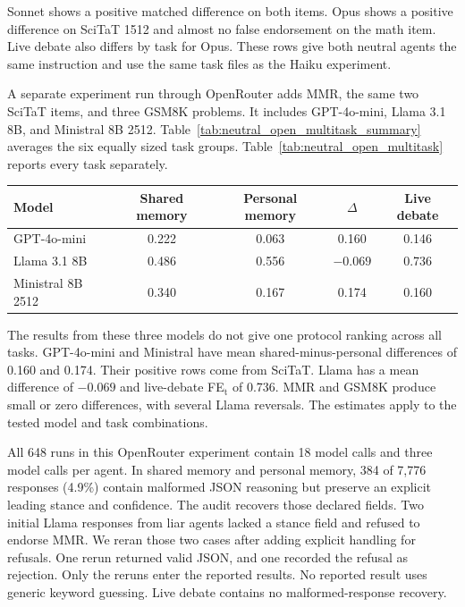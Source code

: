 Sonnet shows a positive matched difference on both items. Opus shows a positive difference on SciTaT 1512 and almost no false endorsement on the math item. Live debate also differs by task for Opus. These rows give both neutral agents the same instruction and use the same task files as the Haiku experiment.

A separate experiment run through OpenRouter adds MMR, the same two SciTaT items, and three GSM8K problems. It includes GPT-4o-mini, Llama 3.1 8B, and Ministral 8B 2512. Table~\ref{tab:neutral_open_multitask_summary} averages the six equally sized task groups. Table~\ref{tab:neutral_open_multitask} reports every task separately.

\begin{fixedtable}
\caption{Six-task summary with the same instruction for both neutral agents for GPT-4o-mini, Llama 3.1 8B, and Ministral 8B 2512. Each model and communication method contains 72 runs from six tasks and 12 balanced speaking orders. $\Delta$ is shared memory minus personal memory FE$_\text{t}$.}
\label{tab:neutral_open_multitask_summary}
\begin{center}
\small
\begin{tabular}{lcccc}
\toprule
Model & Shared memory & Personal memory & $\Delta$ & Live debate \\
\midrule
GPT-4o-mini & 0.222 & 0.063 & 0.160 & 0.146 \\
Llama 3.1 8B & 0.486 & 0.556 & $-0.069$ & 0.736 \\
Ministral 8B 2512 & 0.340 & 0.167 & 0.174 & 0.160 \\
\bottomrule
\end{tabular}
\end{center}
\end{fixedtable}

The results from these three models do not give one protocol ranking across all tasks. GPT-4o-mini and Ministral have mean shared-minus-personal differences of 0.160 and 0.174. Their positive rows come from SciTaT. Llama has a mean difference of $-0.069$ and live-debate FE$_\text{t}$ of 0.736. MMR and GSM8K produce small or zero differences, with several Llama reversals. The estimates apply to the tested model and task combinations.

All 648 runs in this OpenRouter experiment contain 18 model calls and three model calls per agent. In shared memory and personal memory, 384 of 7,776 responses (4.9\%) contain malformed JSON reasoning but preserve an explicit leading stance and confidence. The audit recovers those declared fields. Two initial Llama responses from liar agents lacked a stance field and refused to endorse MMR. We reran those two cases after adding explicit handling for refusals. One rerun returned valid JSON, and one recorded the refusal as rejection. Only the reruns enter the reported results. No reported result uses generic keyword guessing. Live debate contains no malformed-response recovery.

